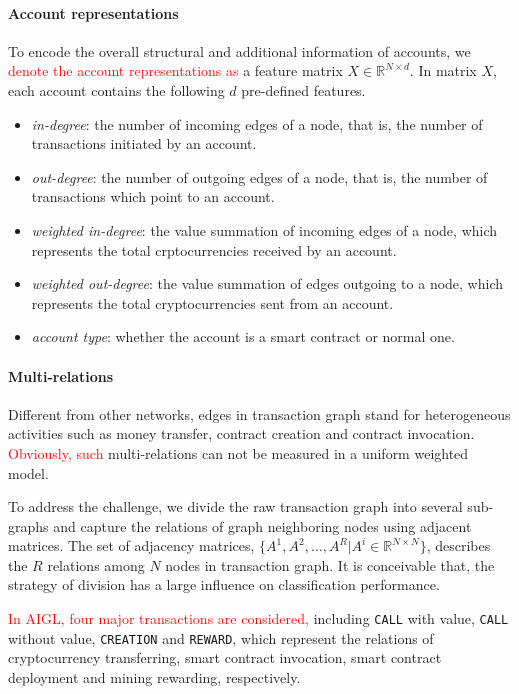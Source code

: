 \paragraph{Account representations} To encode the overall structural and additional information of accounts, we \textcolor{red}{denote the account representations as} a feature matrix $X \in \mathbb{R}^{N \times d}$. In matrix $X$, each account contains the following $d$ pre-defined features.

\begin{itemize}
	\item \emph{in-degree}: the number of incoming edges of a node, that is, the number of transactions initiated by an account.
	\item \emph{out-degree}: the number of outgoing edges of a node, that is, the number of transactions which point to an account.
	\item \emph{weighted in-degree}: the value summation of incoming edges of a node, which represents the total crptocurrencies received by an account.
	\item \emph{weighted out-degree}: the value summation of edges outgoing to a node, which represents the total cryptocurrencies sent from an account.
	\item \emph{account type}: whether the account is a smart contract or normal one.
\end{itemize}

\paragraph{Multi-relations} Different from other networks, edges in transaction graph stand for heterogeneous activities such as money transfer, contract creation and contract invocation. \textcolor{red}{Obviously, such} multi-relations can not be measured in a uniform weighted model.

To address the challenge, we divide the raw transaction graph into several sub-graphs and capture the relations of graph neighboring nodes using adjacent matrices. The set of adjacency matrices, $\{A^1,A^2,\dots,A^R|A^i\in \mathbb{R}^{N \times N}\}$, describes the $R$ relations among $N$ nodes in transaction graph. It is conceivable that, the strategy of division has a large influence on classification performance.

\textcolor{red}{In AIGL, four major transactions are considered,} including \texttt{CALL} with value, \texttt{CALL} without value, \texttt{CREATION} and \texttt{REWARD}, which represent the relations of cryptocurrency transferring, smart contract invocation, smart contract deployment and mining rewarding, respectively. 

